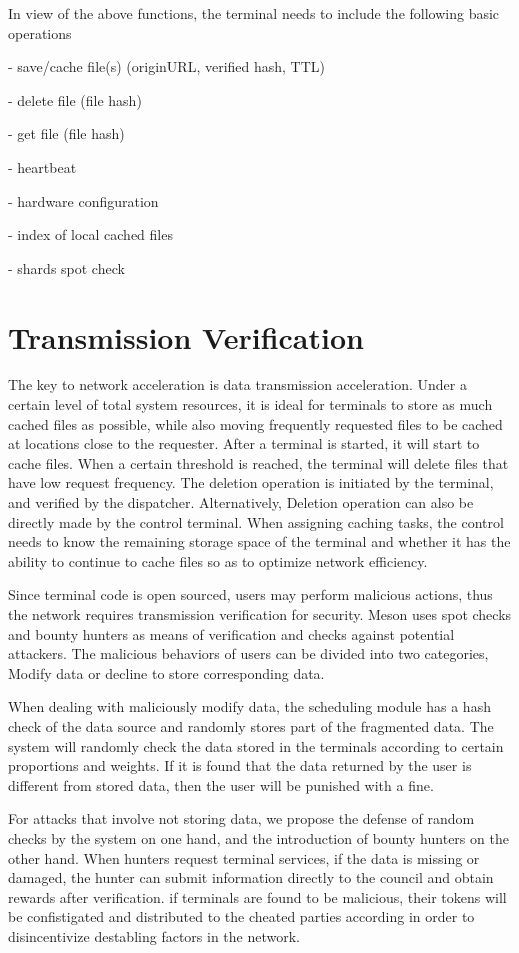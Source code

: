 \documentclass[12pt, a4paper, unicode]{report}
\begin{document}
    In view of the above functions, the terminal needs to include the following basic operations

    - save/cache file(s) (originURL, verified hash, TTL)
    
    - delete file (file hash)
    
    - get file (file hash)
    
    - heartbeat
    
    - hardware configuration
    
    - index of local cached files
    
    - shards spot check
    
    \section{Transmission Verification}
    The key to network acceleration is data transmission acceleration. Under a certain level of total system resources, it is ideal for terminals to store as much cached files as possible, while also moving frequently requested files to be cached at locations close to the requester. After a terminal is started, it will start to cache files. When a certain threshold is reached, the terminal will delete files that have low request frequency. The deletion operation is initiated by the terminal, and verified by the dispatcher. Alternatively, Deletion operation can also be directly made by the control terminal. When assigning caching tasks, the control needs to know the remaining storage space of the terminal and whether it has the ability to continue to cache files so as to optimize network efficiency.

    Since terminal code is open sourced, users may perform malicious actions, thus the network requires transmission verification for security. Meson uses spot checks and bounty hunters as means of verification and checks against potential attackers. The malicious behaviors of users can be divided into two categories, Modify data or decline to store corresponding data. 

    When dealing with maliciously modify data, the scheduling module has a hash check of the data source and randomly stores part of the fragmented data. The system will randomly check the data stored in the terminals according to certain proportions and weights. If it is found that the data returned by the user is different from stored data, then the user will be punished with a fine. 

    For attacks that involve not storing data, we propose the defense of random checks by the system on one hand, and the introduction of bounty hunters on the other hand. When hunters request terminal services, if the data is missing or damaged, the hunter can submit information directly to the council and obtain rewards after verification. if terminals are found to be malicious, their tokens will be confistigated and distributed to the cheated parties according in order to disincentivize destabling factors in the network.
    
\end{document}
